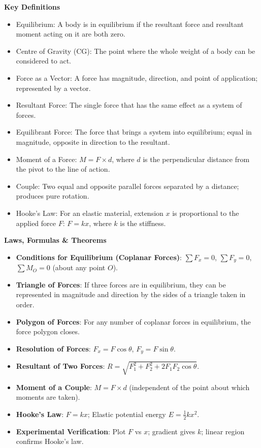 \documentclass[11pt]{article}
\newcommand{\cle}[1]{{\popxbold\color{popdark}#1}}
\begin{document}
\begin{bilan}
\textbf{Key Definitions}
\begin{itemize}
\item \cle{Equilibrium}: A body is in equilibrium if the resultant force and resultant moment acting on it are both zero.
\item \cle{Centre of Gravity (CG)}: The point where the whole weight of a body can be considered to act.
\item \cle{Force as a Vector}: A force has magnitude, direction, and point of application; represented by a vector.
\item \cle{Resultant Force}: The single force that has the same effect as a system of forces.
\item \cle{Equilibrant Force}: The force that brings a system into equilibrium; equal in magnitude, opposite in direction to the resultant.
\item \cle{Moment of a Force}: $M = F \times d$, where $d$ is the perpendicular distance from the pivot to the line of action.
\item \cle{Couple}: Two equal and opposite parallel forces separated by a distance; produces pure rotation.
\item \cle{Hooke's Law}: For an elastic material, extension $x$ is proportional to the applied force $F$: $F = kx$, where $k$ is the stiffness.
\end{itemize}

\textbf{Laws, Formulas \& Theorems}
\begin{itemize}
\item \textbf{Conditions for Equilibrium (Coplanar Forces)}:
  $\sum F_x = 0$, $\sum F_y = 0$, $\sum M_O = 0$ (about any point $O$).
\item \textbf{Triangle of Forces}: If three forces are in equilibrium, they can be represented in magnitude and direction by the sides of a triangle taken in order.
\item \textbf{Polygon of Forces}: For any number of coplanar forces in equilibrium, the force polygon closes.
\item \textbf{Resolution of Forces}: $F_x = F\cos\theta$, $F_y = F\sin\theta$.
\item \textbf{Resultant of Two Forces}: $R = \sqrt{F_1^2 + F_2^2 + 2F_1F_2\cos\theta}$.
\item \textbf{Moment of a Couple}: $M = F \times d$ (independent of the point about which moments are taken).
\item \textbf{Hooke's Law}: $F = kx$; Elastic potential energy $E = \frac{1}{2}kx^2$.
\item \textbf{Experimental Verification}: Plot $F$ vs $x$; gradient gives $k$; linear region confirms Hooke's law.
\end{itemize}


\end{bilan}
\end{document}
